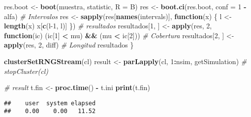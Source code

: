 \documentclass[
]{book}
\newenvironment{Shaded}{\begin{snugshade}}{\end{snugshade}}
\newcommand{\CommentTok}[1]{\textcolor[rgb]{0.56,0.35,0.01}{\textit{#1}}}
\newcommand{\ControlFlowTok}[1]{\textcolor[rgb]{0.13,0.29,0.53}{\textbf{#1}}}
\newcommand{\DataTypeTok}[1]{\textcolor[rgb]{0.13,0.29,0.53}{#1}}
\newcommand{\DecValTok}[1]{\textcolor[rgb]{0.00,0.00,0.81}{#1}}
\newcommand{\KeywordTok}[1]{\textcolor[rgb]{0.13,0.29,0.53}{\textbf{#1}}}
\newcommand{\NormalTok}[1]{#1}
\newcommand{\OperatorTok}[1]{\textcolor[rgb]{0.81,0.36,0.00}{\textbf{#1}}}
\newcommand{\StringTok}[1]{\textcolor[rgb]{0.31,0.60,0.02}{#1}}
\theoremstyle{definition}
\theoremstyle{definition}
\theoremstyle{definition}
\theoremstyle{remark}
\begin{document}
\begin{Shaded}
\begin{Highlighting}[]
\NormalTok{    res.boot <-}\StringTok{ }\KeywordTok{boot}\NormalTok{(muestra, statistic, }\DataTypeTok{R =}\NormalTok{ B)}
\NormalTok{    res <-}\StringTok{ }\KeywordTok{boot.ci}\NormalTok{(res.boot, }\DataTypeTok{conf =} \DecValTok{1} \OperatorTok{-}\StringTok{ }\NormalTok{alfa)}
    \CommentTok{# Intervalos}
\NormalTok{    res <-}\StringTok{ }\KeywordTok{sapply}\NormalTok{(res[}\KeywordTok{names}\NormalTok{(intervals)], }\ControlFlowTok{function}\NormalTok{(x) \{}
\NormalTok{      l <-}\StringTok{ }\KeywordTok{length}\NormalTok{(x)}
\NormalTok{      x[}\KeywordTok{c}\NormalTok{(l}\DecValTok{-1}\NormalTok{, l)]}
\NormalTok{    \})}
    \CommentTok{# resultados}
\NormalTok{    resultados[}\DecValTok{1}\NormalTok{, ] <-}\StringTok{ }\KeywordTok{apply}\NormalTok{(res, }\DecValTok{2}\NormalTok{,}
                                   \ControlFlowTok{function}\NormalTok{(ic) (ic[}\DecValTok{1}\NormalTok{] }\OperatorTok{<}\StringTok{ }\NormalTok{mu) }\OperatorTok{&&}\StringTok{ }\NormalTok{(mu }\OperatorTok{<}\StringTok{ }\NormalTok{ic[}\DecValTok{2}\NormalTok{])) }\CommentTok{# Cobertura}
\NormalTok{    resultados[}\DecValTok{2}\NormalTok{, ] <-}\StringTok{ }\KeywordTok{apply}\NormalTok{(res, }\DecValTok{2}\NormalTok{, diff) }\CommentTok{# Longitud}
\NormalTok{    resultados}
\NormalTok{\}}

\KeywordTok{clusterSetRNGStream}\NormalTok{(cl)}
\NormalTok{result <-}\StringTok{ }\KeywordTok{parLapply}\NormalTok{(cl, }\DecValTok{1}\OperatorTok{:}\NormalTok{nsim, getSimulation)}
\CommentTok{# stopCluster(cl)}

\CommentTok{# result}
\NormalTok{t.fin <-}\StringTok{ }\KeywordTok{proc.time}\NormalTok{() }\OperatorTok{-}\StringTok{ }\NormalTok{t.ini}
\KeywordTok{print}\NormalTok{(t.fin)}
\end{Highlighting}
\end{Shaded}

\begin{verbatim}
##    user  system elapsed 
##    0.00    0.00   11.52
\end{verbatim}
\end{document}
